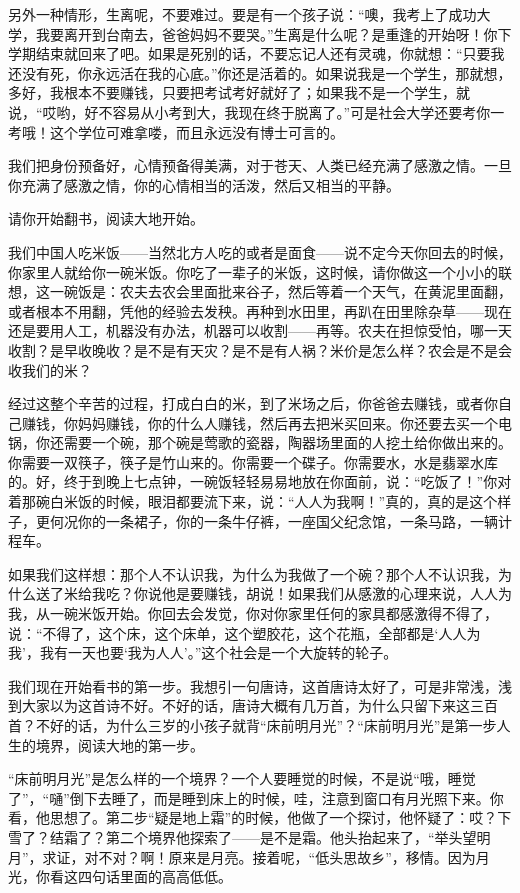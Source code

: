 \par 另外一种情形，生离呢，不要难过。要是有一个孩子说：“噢，我考上了成功大学，我要离开到台南去，爸爸妈妈不要哭。”生离是什么呢？是重逢的开始呀！你下学期结束就回来了吧。如果是死别的话，不要忘记人还有灵魂，你就想：“只要我还没有死，你永远活在我的心底。”你还是活着的。如果说我是一个学生，那就想，多好，我根本不要赚钱，只要把考试考好就好了；如果我不是一个学生，就说，“哎哟，好不容易从小考到大，我现在终于脱离了。”可是社会大学还要考你一考哦！这个学位可难拿喽，而且永远没有博士可言的。
\par 我们把身份预备好，心情预备得美满，对于苍天、人类已经充满了感激之情。一旦你充满了感激之情，你的心情相当的活泼，然后又相当的平静。
\par 请你开始翻书，阅读大地开始。
\par 我们中国人吃米饭——当然北方人吃的或者是面食——说不定今天你回去的时候，你家里人就给你一碗米饭。你吃了一辈子的米饭，这时候，请你做这一个小小的联想，这一碗饭是：农夫去农会里面批来谷子，然后等着一个天气，在黄泥里面翻，或者根本不用翻，凭他的经验去发秧。再种到水田里，再趴在田里除杂草——现在还是要用人工，机器没有办法，机器可以收割——再等。农夫在担惊受怕，哪一天收割？是早收晚收？是不是有天灾？是不是有人祸？米价是怎么样？农会是不是会收我们的米？
\par 经过这整个辛苦的过程，打成白白的米，到了米场之后，你爸爸去赚钱，或者你自己赚钱，你妈妈赚钱，你的什么人赚钱，然后再去把米买回来。你还要去买一个电锅，你还需要一个碗，那个碗是莺歌的瓷器，陶器场里面的人挖土给你做出来的。你需要一双筷子，筷子是竹山来的。你需要一个碟子。你需要水，水是翡翠水库的。好，终于到晚上七点钟，一碗饭轻轻易易地放在你面前，说：“吃饭了！”你对着那碗白米饭的时候，眼泪都要流下来，说：“人人为我啊！”真的，真的是这个样子，更何况你的一条裙子，你的一条牛仔裤，一座国父纪念馆，一条马路，一辆计程车。
\par 如果我们这样想：那个人不认识我，为什么为我做了一个碗？那个人不认识我，为什么送了米给我吃？你说他是要赚钱，胡说！如果我们从感激的心理来说，人人为我，从一碗米饭开始。你回去会发觉，你对你家里任何的家具都感激得不得了，说：“不得了，这个床，这个床单，这个塑胶花，这个花瓶，全部都是‘人人为我’，我有一天也要‘我为人人’。”这个社会是一个大旋转的轮子。
\par 我们现在开始看书的第一步。我想引一句唐诗，这首唐诗太好了，可是非常浅，浅到大家以为这首诗不好。不好的话，唐诗大概有几万首，为什么只留下来这三百首？不好的话，为什么三岁的小孩子就背“床前明月光”？“床前明月光”是第一步人生的境界，阅读大地的第一步。
\par “床前明月光”是怎么样的一个境界？一个人要睡觉的时候，不是说“哦，睡觉了”，“嗵”倒下去睡了，而是睡到床上的时候，哇，注意到窗口有月光照下来。你看，他思想了。第二步“疑是地上霜”的时候，他做了一个探讨，他怀疑了：哎？下雪了？结霜了？第二个境界他探索了——是不是霜。他头抬起来了，“举头望明月”，求证，对不对？啊！原来是月亮。接着呢，“低头思故乡”，移情。因为月光，你看这四句话里面的高高低低。
